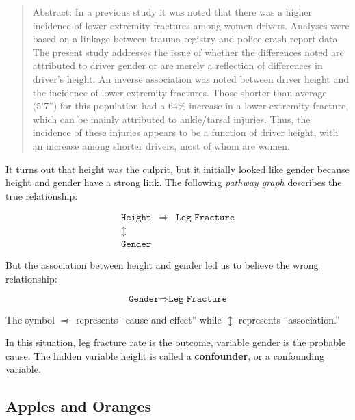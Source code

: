 \documentclass[11pt]{book}\usepackage[]{graphicx}\usepackage[]{color}
\begin{document}
\begin{quotation}
Abstract: In a previous study it was noted that there was a higher incidence of lower-extremity fractures among women drivers. Analyses were based on a linkage between trauma registry and police crash report data. The present study addresses the issue of whether the differences noted are attributed to driver gender or are merely a reflection of differences in driver's height. An inverse association was noted between driver height and the incidence of lower-extremity fractures. Those shorter than average (5'7'') for this population had a 64\% increase in a lower-extremity fracture, which can be mainly attributed to ankle/tarsal injuries. Thus, the incidence of these injuries appears to be a function of driver height, with an increase among shorter drivers, most of whom are women.
\end{quotation}  \citep{dischinger1995}

It turns out that height was the culprit, but it initially looked like gender because height and gender have a strong link.  The following \textit{pathway graph} describes the true relationship:

\begin{eqnarray*}
\texttt{Height} & \Rightarrow & \texttt{Leg Fracture} \\
\updownarrow &  & \\
\texttt{Gender} & &
\end{eqnarray*}

But the association between height and gender led us to believe the wrong relationship:

$$ \texttt{Gender} \Rightarrow  \texttt{Leg Fracture} $$

The symbol $\Rightarrow$ represents ``cause-and-effect'' while $\updownarrow$      represents ``association.''

In this situation, leg fracture rate is the outcome, variable gender is the probable cause.  The hidden variable height is called a \textbf{confounder}, or a confounding variable.


\subsection{Apples and Oranges}
\end{document}
